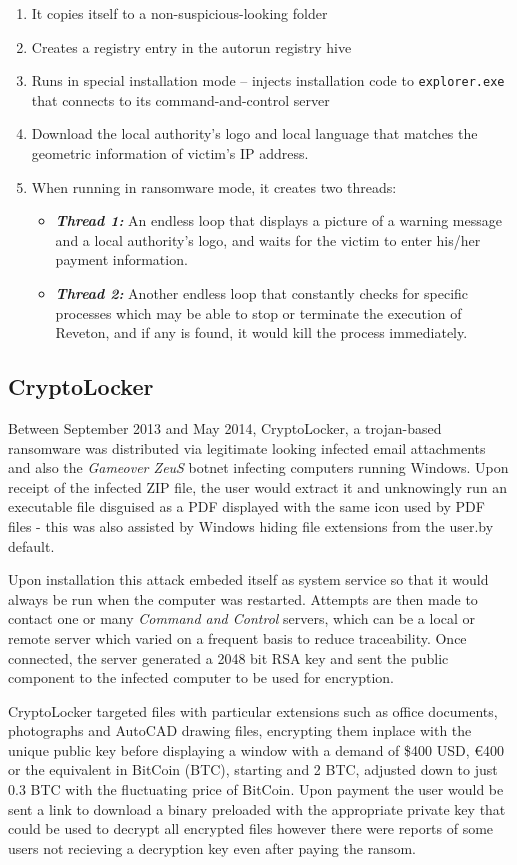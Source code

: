 \documentclass[10pt,a4paper]{article}
\begin{document}
\begin{enumerate}
\item It copies itself to a non-suspicious-looking folder
\item Creates a registry entry in the autorun registry hive
\item Runs in special installation mode – injects installation code to \texttt{explorer.exe} that connects to its command-and-control server
\item Download the local authority’s logo and local language that matches the geometric information of victim’s IP address.
\item When running in ransomware mode, it creates two threads:
\begin{itemize}
\item \textbf{\textit{Thread 1: }}An endless loop that displays a picture of a warning message and a local authority’s logo, and waits for the victim to enter his/her payment information.
\item \textbf{\textit{Thread 2: }}Another endless loop that constantly checks for specific processes which may be able to stop or terminate the execution of Reveton, and if any is found, it would kill the process immediately.
\end{itemize}
\end{enumerate}

\subsection{CryptoLocker}
Between September 2013 and May 2014, CryptoLocker, a trojan-based ransomware was distributed via legitimate looking infected email attachments and also the \textit{Gameover ZeuS} botnet infecting computers running Windows. Upon receipt of the infected ZIP file, the user would extract it and unknowingly run an executable file disguised as a PDF displayed with the same icon used by PDF files \-- this was also assisted by Windows hiding file extensions from the user.by default.

Upon installation this attack embeded itself as system service so that it would always be run when the computer was restarted. Attempts are then made to contact one or many \textit{Command and Control} servers, which can be a local or remote server which varied on a frequent basis to reduce traceability. Once connected, the server generated a 2048 bit RSA key and sent the public component to the infected computer to be used for encryption.

CryptoLocker targeted files with particular extensions such as office documents, photographs and AutoCAD drawing files, encrypting them inplace with the unique public key before displaying a window with a demand of \$400 USD, \euro400 or the equivalent in BitCoin (BTC), starting and 2 BTC, adjusted down to just 0.3 BTC with the fluctuating price of BitCoin. Upon payment the user would be sent a link to download a binary preloaded with the appropriate private key that could be used to decrypt all encrypted files however there were reports of some users not recieving a decryption key even after paying the ransom.
\end{document}
